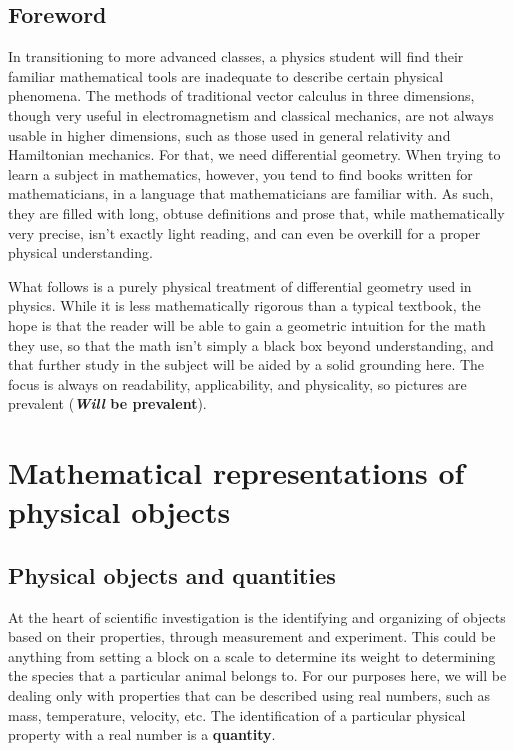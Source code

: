 \documentclass{book}
\begin{document}
\section{Foreword}
In transitioning to more advanced classes, a physics student will find their familiar mathematical tools are inadequate to describe certain physical phenomena. The methods of traditional vector calculus in three dimensions, though very useful in electromagnetism and classical mechanics, are not always usable in higher dimensions, such as those used in general relativity and Hamiltonian mechanics. For that, we need differential geometry. When trying to learn a subject in mathematics, however, you tend to find books written for mathematicians, in a language that mathematicians are familiar with. As such, they are filled with long, obtuse definitions and prose that, while mathematically very precise, isn't exactly light reading, and can even be overkill for a proper physical understanding. 

What follows is a purely physical treatment of differential geometry used in physics. While it is less mathematically rigorous than a typical textbook, the hope is that the reader will be able to gain a geometric intuition for the math they use, so that the math isn't simply a black box beyond understanding, and that further study in the subject will be aided by a solid grounding here. The focus is always on readability, applicability, and physicality, so pictures are prevalent (\textbf{\textit{Will} be prevalent}). 




\tableofcontents




\chapter{Mathematical representations of physical objects}



\section{Physical objects and quantities}

At the heart of scientific investigation is the identifying and organizing of objects based on their properties, through measurement and experiment. This could be anything from setting a block on a scale to determine its weight to determining the species that a particular animal belongs to. For our purposes here, we will be dealing only with properties that can be described using real numbers, such as mass, temperature, velocity, etc. The identification of a particular physical property with a real number is a \textbf{quantity}.
\end{document}
